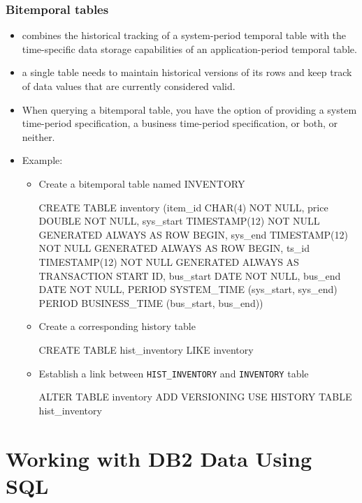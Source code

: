 \documentclass{article}
\begin{document}
\subsubsection{Bitemporal tables}
\begin{itemize}
	\item combines the historical tracking of a system-period temporal table with the time-specific data storage capabilities of an application-period temporal table.
	\item a single table needs to maintain historical versions of its rows and keep track of data values that are currently considered valid.
	\item When querying a bitemporal table, you have the option of providing a system time-period 
	specification, a business time-period specification, or both, or neither.
	\item Example: 
		\begin{itemize}
			\item Create a bitemporal table named INVENTORY
\begin{sqlcode}
CREATE TABLE inventory
(item_id         CHAR(4) NOT NULL,
 price           DOUBLE NOT NULL,
 sys_start       TIMESTAMP(12) NOT NULL
				 GENERATED ALWAYS AS ROW BEGIN,
 sys_end         TIMESTAMP(12) NOT NULL
				 GENERATED ALWAYS AS ROW BEGIN,
 ts_id           TIMESTAMP(12) NOT NULL
 				GENERATED ALWAYS AS
 				TRANSACTION START ID, 
 bus_start       DATE NOT NULL,
 bus_end         DATE NOT NULL,
 PERIOD SYSTEM_TIME (sys_start, sys_end)
 PERIOD BUSINESS_TIME (bus_start, bus_end))
\end{sqlcode}
			\item Create a corresponding history table
\begin{sqlcode}
CREATE TABLE hist_inventory LIKE inventory
\end{sqlcode}
			\item Establish a link between \texttt{HIST\_INVENTORY} and \texttt{INVENTORY} table
\begin{sqlcode}
ALTER TABLE inventory
ADD VERSIONING
USE HISTORY TABLE hist_inventory
\end{sqlcode}
		\end{itemize}
\end{itemize}

\newpage
\section{Working with DB2 Data Using SQL}
\end{document}
